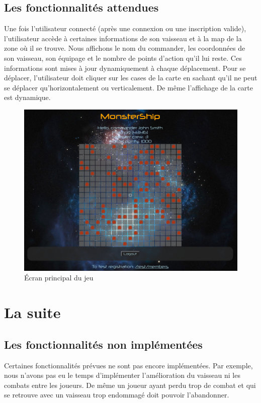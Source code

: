 \documentclass[a4paper,11pt]{report}
\begin{document}
  \section{Les fonctionnalités attendues}
      Une fois l'utilisateur connecté (après une connexion ou une inscription valide), l'utilisateur accède à certaines informations de son vaisseau et à la map de la zone où il se trouve.
      Nous affichons le nom du commander, les coordonnées de son vaisseau, son équipage et le nombre de points d'action qu'il lui reste. Ces informations sont mises à jour dynamiquement à chaque déplacement.
      Pour se déplacer, l'utilisateur doit cliquer sur les cases de la carte en sachant qu'il ne peut se déplacer qu'horizontalement ou verticalement. De même l'affichage de la carte est dynamique.
      \begin{figure}[H]
        \begin{center}
          \includegraphics[width=.8\textwidth]{images/home.png}
          \caption{Écran principal du jeu}
          \label{fig:ec_home}
        \end{center}
      \end{figure}

    

\chapter{La suite}

  \section{Les fonctionnalités non implémentées}
    Certaines fonctionnalités prévues ne sont pas encore implémentées. 
    Par exemple, nous n'avons pas eu le temps d'implémenter l'amélioration du vaisseau ni les combats entre les joueurs.
    De même un joueur ayant perdu trop de combat et qui se retrouve avec un vaisseau trop endommagé doit pouvoir l'abandonner.
    
\end{document}
